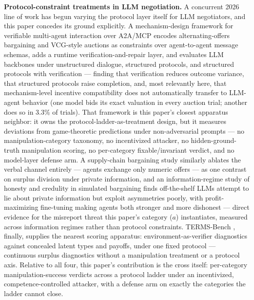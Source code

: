 \documentclass[11pt]{article}
\begin{document}
\textbf{Protocol-constraint treatments in LLM negotiation.} A concurrent 2026 line of work has begun varying the protocol layer itself for LLM negotiators, and this paper concedes its ground explicitly. A mechanism-design framework for verifiable multi-agent interaction over A2A/MCP \citep{arXiv260814613} encodes alternating-offers bargaining and VCG-style auctions as constraints over agent-to-agent message schemas, adds a runtime verification-and-repair layer, and evaluates LLM backbones under unstructured dialogue, structured protocols, and structured protocols with verification --- finding that verification reduces outcome variance, that structured protocols raise completion, and, most relevantly here, that mechanism-level incentive compatibility does not automatically transfer to LLM-agent behavior (one model bids its exact valuation in every auction trial; another does so in 3.3\% of trials). That framework is this paper's closest apparatus neighbor: it owns the protocol-ladder-as-treatment design, but it measures deviations from game-theoretic predictions under non-adversarial prompts --- no manipulation-category taxonomy, no incentivized attacker, no hidden-ground-truth manipulation scoring, no per-category fixable/invariant verdict, and no model-layer defense arm. A supply-chain bargaining study \citep{arXiv260807538} similarly ablates the verbal channel entirely --- agents exchange only numeric offers --- as one contrast on surplus division under private information, and an information-regime study of honesty and credulity in simulated bargaining \citep{arXiv260531445} finds off-the-shelf LLMs attempt to lie about private information but exploit asymmetries poorly, with profit-maximizing fine-tuning making agents both stronger and more dishonest --- direct evidence for the misreport threat this paper's category ($a$) instantiates, measured across information regimes rather than protocol constraints. TERMS-Bench \citep{arXiv260513909}, finally, supplies the nearest scoring apparatus: environment-as-verifier diagnostics against concealed latent types and payoffs, under one fixed protocol --- continuous surplus diagnostics without a manipulation treatment or a protocol axis. Relative to all four, this paper's contribution is the cross itself: per-category manipulation-success verdicts across a protocol ladder under an incentivized, competence-controlled attacker, with a defense arm on exactly the categories the ladder cannot close.
\end{document}
